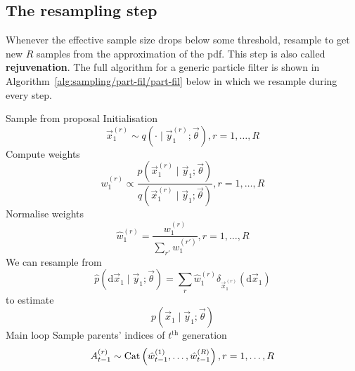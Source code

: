 \subsection{The resampling step}
    Whenever the effective sample size drops below some threshold, resample to get new $R$ samples from the approximation of the pdf. This step is also called \textbf{rejuvenation}. The full algorithm for a generic particle filter is shown in Algorithm~\ref{alg:sampling/part-fil/part-fil} below in which we resample during every step.
    \begin{algorithmbis}\label{alg:sampling/part-fil/part-fil}
        \begin{algorithmic}[1]
            \State Sample from proposal \Comment Initialisation
                \begin{equation}
                    \vec x_1^{(r)} \sim q\left(\cdot \mid \vec y_1^{(r)}; \vec \theta\right), r = 1, \dotsc, R
                \end{equation}
            \State Compute weights
                \begin{equation}
                    w_1^{(r)} \propto \frac{p\left(\vec x_1^{(r)} \mid \vec y_1; \vec \theta\right)}{q\left(\vec x_1^{(r)} \mid \vec y_1; \vec \theta \right)}, r = 1, \dotsc, R
                \end{equation}
            \State Normalise weights
                \begin{equation}
                    \hat w_1^{(r)} = \frac{w_1^{(r)}}{\sum_{r'} w_1^{(r')}}, r = 1, \dotsc, R
                \end{equation}
            \State We can resample from 
                \begin{equation}
                    \hat p(\mathrm d \vec x_1 \mid \vec y_1; \vec \theta) = \sum_r \hat w_1^{(r)} \delta_{\vec x_1^{(r)}}(\mathrm d\vec x_1)
                \end{equation}
                to estimate
                \begin{equation}
                    p(\vec x_1 \mid \vec y_1; \vec \theta)
                \end{equation}
             \Comment Main loop
                \State Sample parents' indices of $t^{\text{th}}$ generation
                    \begin{equation}
                        A_{t - 1}^{(r)} \sim \operatorname{Cat}\left(\hat w_{t - 1}^{(1)}, \dotsc, \hat w_{t - 1}^{(R)}\right), r = 1, \dotsc, R
                    \end{equation}

\end{algorithmic}
\end{algorithmbis}
